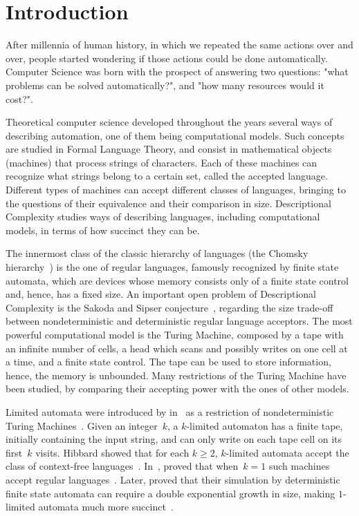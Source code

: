 \chapter{Introduction}
After millennia of human history, in which we repeated the same actions over and over, people started wondering if those actions could be done automatically.
Computer Science was born with the prospect of answering two questions: "what problems can be solved automatically?", and "how many resources would it cost?".

Theoretical computer science developed throughout the years several ways of describing automation, one of them being computational models.
Such concepts are studied in Formal Language Theory, and consist in mathematical objects (machines) that process strings of characters.
Each of these machines can recognize what strings belong to a certain set, called the accepted language.
Different types of machines can accept different classes of languages, bringing to the questions of their equivalence and their comparison in size.
Descriptional Complexity studies ways of describing languages, including computational models, in terms of how succinct they can be.

The innermost class of the classic hierarchy of languages (the Chomsky hierarchy~\cite{Cho56}) is the one of regular languages, famously recognized by finite state automata, which are devices whose memory consists only of a finite state control and, hence, has a fixed size.
An important open problem of Descriptional Complexity is the Sakoda and Sipser conjecture~\cite{SakSip78}, regarding the size trade-off between nondeterministic and deterministic regular language acceptors.
The most powerful computational model is the Turing Machine, composed by a tape with an infinite number of cells, a head which scans and possibly writes on one cell at a time, and a finite state control. The tape can be used to store information, hence, the memory is unbounded.
Many restrictions of the Turing Machine have been studied, by comparing their accepting power with the ones of other models.

Limited automata were introduced by \citeauthor{Hib67} in~\citeyear{Hib67} as a restriction of nondeterministic Turing Machines~\cite{Hib67}.
Given an integer~$k$, a $k$-limited automaton has a finite tape, initially containing the input string, and can only write on each tape cell on its first~$k$ visits.
Hibbard showed that for each $k\ge2$, $k$-limited automata accept the class of context-free languages~\cite{Hib67}.
In~\citeyear{WagWec86}, \citeauthor{WagWec86} proved that when~$k=1$ such machines accept regular languages~\cite{WagWec86}.
Later, \citeauthor{PigPis14} proved that their simulation by deterministic finite state automata can require a double exponential growth in size, making $1$-limited automata much more succinct~\cite{PigPis14}.

